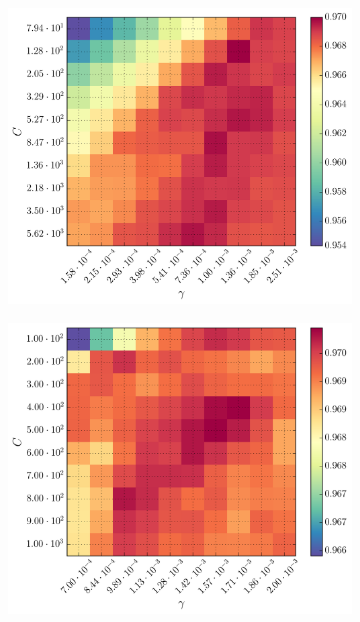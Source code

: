 \begin{figure}[h]
\begin{subfigure}[t]{0.49\textwidth}
		\includegraphics[width=\textwidth]{figures/gridsearch/svm/superclasses/svm-superclasses-04.png}		
	\end{subfigure}
	\begin{subfigure}[t]{0.49\textwidth}
		\centering
		\includegraphics[width=\textwidth]{figures/gridsearch/svm/superclasses/svm-superclasses-05.png}				
	\end{subfigure}
	\begin{subfigure}[t]{0.49\textwidth}
		\centering

\end{subfigure}
\end{figure}
